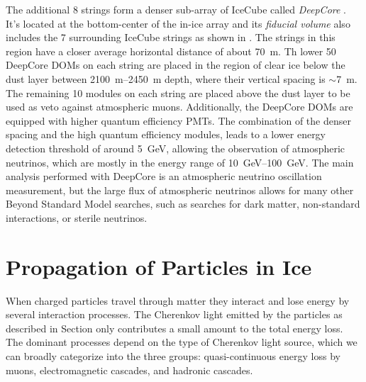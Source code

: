 The additional 8 strings form a denser sub-array of IceCube called \textit{DeepCore} . It's located at the bottom-center of the in-ice array and its \textit{fiducial volume} also includes the 7 surrounding IceCube strings as shown in . The strings in this region have a closer average horizontal distance of about \SI{70}{\metre}. Th lower 50 DeepCore DOMs on each string are placed in the region of clear ice below the dust layer between \SIrange{2100}{2450}{\metre} depth, where their vertical spacing is $\sim$\SI{7}{\metre}. The remaining 10 modules on each string are placed above the dust layer to be used as veto against atmospheric muons. Additionally, the DeepCore DOMs are equipped with higher quantum efficiency PMTs. The combination of the denser spacing and the high quantum efficiency modules, leads to a lower energy detection threshold of around \SI{5}{GeV}, allowing the observation of atmospheric neutrinos, which are mostly in the energy range of \SIrange{10}{100}{\giga\electronvolt}. The main analysis performed with DeepCore is an atmospheric neutrino oscillation measurement, but the large flux of atmospheric neutrinos allows for many other Beyond Standard Model searches, such as searches for dark matter, non-standard interactions, or sterile neutrinos. 


\section{Propagation of Particles in Ice} 



When charged particles travel through matter they interact and lose energy by several interaction processes.
The Cherenkov light emitted by the particles as described in Section  only contributes a small amount to the total energy loss.
The dominant processes depend on the type of Cherenkov light source, which we can broadly categorize into the three groups: quasi-continuous energy loss by muons, electromagnetic cascades, and hadronic cascades.

